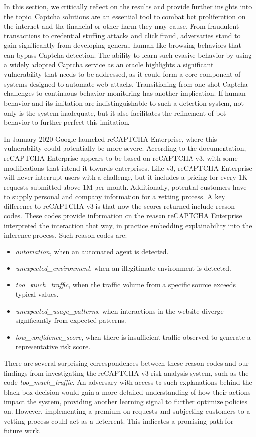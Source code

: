 In this section, we critically reflect on the results and provide further insights into the topic.
Captcha solutions are an essential tool to combat bot proliferation on the internet and the financial or other harm they may cause.
From fraudulent transactions to credential stuffing attacks and click fraud, adversaries stand to gain significantly from developing general, human-like browsing behaviors that can bypass Captcha detection.
The ability to learn such evasive behavior by using a widely adopted Captcha service as an oracle highlights a significant vulnerability that needs to be addressed, as it could form a core component of systems designed to automate web attacks.
Transitioning from one-shot Captcha challenges to continuous behavior monitoring has another implication.
If human behavior and its imitation are indistinguishable to such a detection system, not only is the system inadequate, but it also facilitates the refinement of bot behavior to further perfect this imitation.

In January 2020 Google launched reCAPTCHA Enterprise, where this vulnerability could potentially be more severe.
According to the documentation, reCAPTCHA Enterprise appears to be based on reCAPTCHA v3, with some modifications that intend it towards enterprises.
Like v3, reCAPTCHA Enterprise will never interrupt users with a challenge, but it includes a pricing for every 1K requests submitted above 1M per month.
Additionally, potential customers have to supply personal and company information for a vetting process.
A key difference to reCAPTCHA v3 is that now the scores returned include reason codes.
These codes provide information on the reason reCAPTCHA Enterprise interpreted the interaction that way, in practice embedding explainability into the inference process.
Such reason codes are:
\begin{itemize}
  \item \textit{automation}, when an automated agent is detected.
  \item \textit{unexpected\_environment}, when an illegitimate environment is detected.
  \item \textit{too\_much\_traffic}, when the traffic volume from a specific source exceeds typical values.
  \item \textit{unexpected\_usage\_patterns}, when interactions in the website diverge significantly from expected patterns.
  \item \textit{low\_confidence\_score}, when there is insufficient traffic observed to generate a representative risk score.
\end{itemize}
There are several surprising correspondences between these reason codes and our findings from investigating the reCAPTCHA v3 risk analysis system, such as the code \textit{too\_much\_traffic}.
An adversary with access to such explanations behind the black-box decision would gain a more detailed understanding of how their actions impact the system, providing another learning signal to further optimize policies on.
However, implementing a premium on requests and subjecting customers to a vetting process could act as a deterrent.
This indicates a promising path for future work.

